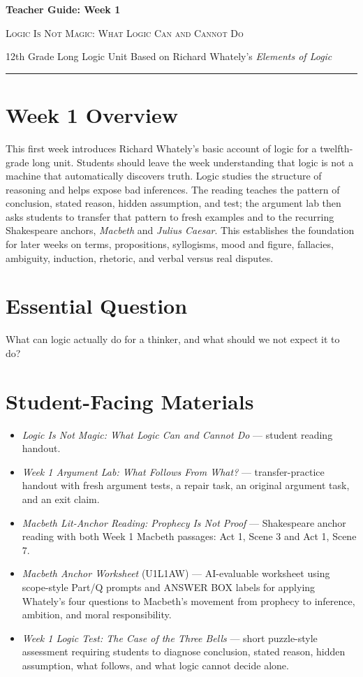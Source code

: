 \documentclass[12pt]{article}
\begin{document}
\begin{center}
{\LARGE\bfseries Teacher Guide: Week 1}\par\vspace{0.25em}
{\large\scshape Logic Is Not Magic: What Logic Can and Cannot Do}\par\vspace{0.4em}
{12th Grade Long Logic Unit Based on Richard Whately's \textit{Elements of Logic}}\par\vspace{0.6em}
\rule{0.82\textwidth}{0.4pt}
\end{center}

\section*{Week 1 Overview}
This first week introduces Richard Whately's basic account of logic for a twelfth-grade long unit. Students should leave the week understanding that logic is not a machine that automatically discovers truth. Logic studies the structure of reasoning and helps expose bad inferences. The reading teaches the pattern of conclusion, stated reason, hidden assumption, and test; the argument lab then asks students to transfer that pattern to fresh examples and to the recurring Shakespeare anchors, \textit{Macbeth} and \textit{Julius Caesar}. This establishes the foundation for later weeks on terms, propositions, syllogisms, mood and figure, fallacies, ambiguity, induction, rhetoric, and verbal versus real disputes.

\section*{Essential Question}
What can logic actually do for a thinker, and what should we not expect it to do?

\section*{Student-Facing Materials}
\begin{itemize}[leftmargin=*]
\item \textit{Logic Is Not Magic: What Logic Can and Cannot Do} — student reading handout.
\item \textit{Week 1 Argument Lab: What Follows From What?} — transfer-practice handout with fresh argument tests, a repair task, an original argument task, and an exit claim.
\item \textit{Macbeth Lit-Anchor Reading: Prophecy Is Not Proof} — Shakespeare anchor reading with both Week 1 Macbeth passages: Act 1, Scene 3 and Act 1, Scene 7.
\item \textit{Macbeth Anchor Worksheet} (U1L1AW) — AI-evaluable worksheet using scope-style Part/Q prompts and ANSWER BOX labels for applying Whately's four questions to Macbeth's movement from prophecy to inference, ambition, and moral responsibility.
\item \textit{Week 1 Logic Test: The Case of the Three Bells} — short puzzle-style assessment requiring students to diagnose conclusion, stated reason, hidden assumption, what follows, and what logic cannot decide alone.
\end{itemize}
\end{document}
